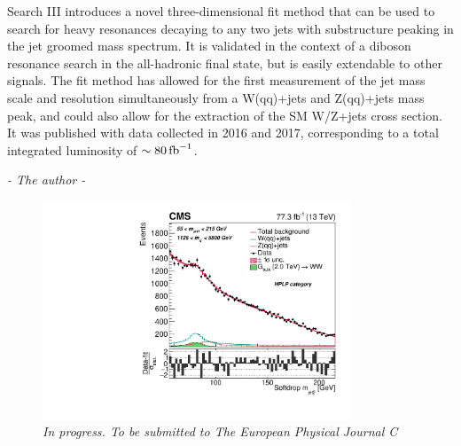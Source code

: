\begin{centering}
{\newline
Search III introduces a novel three-dimensional fit method that can be used to search for heavy resonances decaying to any two jets with substructure peaking in the jet groomed mass spectrum. It is validated in the context of a diboson resonance search in the all-hadronic final state, but is easily extendable to other signals. The fit method has allowed for the first measurement of the jet mass scale and resolution simultaneously from a W(qq)+jets and Z(qq)+jets mass peak, and could also allow for the extraction of the SM W/Z+jets cross section. It was published with data collected in 2016 and 2017, corresponding to a total integrated luminosity of $\sim 80 \mbox{\ensuremath{\,\text{fb}^\text{$-$1}}}$.}
\end{centering}
 \begin{flushright} \textit{- The author - } \end{flushright}
\begin{figure}[h!]
    \centering
    \vspace*{10mm}
    \includegraphics[height=6.5cm]{figures/analysis/search3/B2G-18-002/PostFitComboHPLP_Y-Proj__x___0_-1_z___0_-1.pdf}
    \vspace*{10mm}
    \caption*{\footnotesize{\textit{In progress. To be submitted to The European Physical Journal C}}}
\end{figure}





